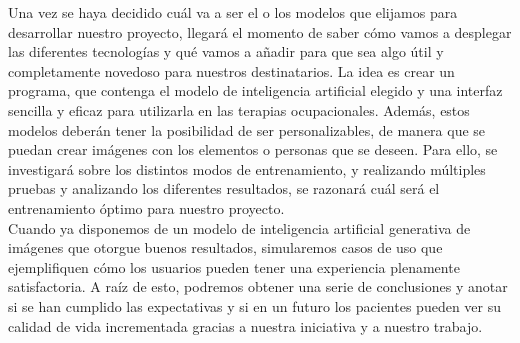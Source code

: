 Una vez se haya decidido cuál va a ser el o los modelos que elijamos para desarrollar nuestro proyecto, llegará el momento de saber cómo vamos a desplegar las diferentes tecnologías y qué vamos a añadir para que sea algo útil y completamente novedoso para nuestros destinatarios. La idea es crear un programa, que contenga el modelo de inteligencia artificial elegido y una interfaz sencilla y eficaz para utilizarla en las terapias ocupacionales. Además, estos modelos deberán tener la posibilidad de ser personalizables, de manera que se puedan crear imágenes con los elementos o personas que se deseen. Para ello, se investigará sobre los distintos modos de entrenamiento, y realizando múltiples pruebas y analizando los diferentes resultados, se razonará cuál será el entrenamiento óptimo para nuestro proyecto.\\

Cuando ya disponemos de un modelo de inteligencia artificial generativa de imágenes que otorgue buenos resultados, simularemos casos de uso que ejemplifiquen cómo los usuarios pueden tener una experiencia plenamente satisfactoria. A raíz de esto, podremos obtener una serie de conclusiones y anotar si se han cumplido las expectativas y si en un futuro los pacientes pueden ver su calidad de vida incrementada gracias a nuestra iniciativa y a nuestro trabajo.\\


